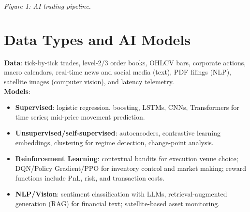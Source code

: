 \documentclass[10pt, a4paper]{article}
\begin{document}
\begin{center}

\vspace{0.3cm}
\textit{Figure 1: AI trading pipeline.}
\end{center}

\section*{Data Types and AI Models}
\textbf{Data}: tick-by-tick trades, level-2/3 order books, OHLCV bars, corporate actions, macro calendars, real-time news and social media (text), PDF filings (NLP), satellite images (computer vision), and latency telemetry.\\[2pt]
\textbf{Models}:
\begin{itemize}[leftmargin=*,itemsep=2pt]
  \item \textbf{Supervised}: logistic regression, boosting, LSTMs, CNNs, Transformers for time series; mid-price movement prediction.
  \item \textbf{Unsupervised/self-supervised}: autoencoders, contrastive learning embeddings, clustering for regime detection, change-point analysis.
  \item \textbf{Reinforcement Learning}: contextual bandits for execution venue choice; DQN/Policy Gradient/PPO for inventory control and market making; reward functions include PnL, risk, and transaction costs.
  \item \textbf{NLP/Vision}: sentiment classification with LLMs, retrieval-augmented generation (RAG) for financial text; satellite-based asset monitoring.
\end{itemize}
\end{document}
